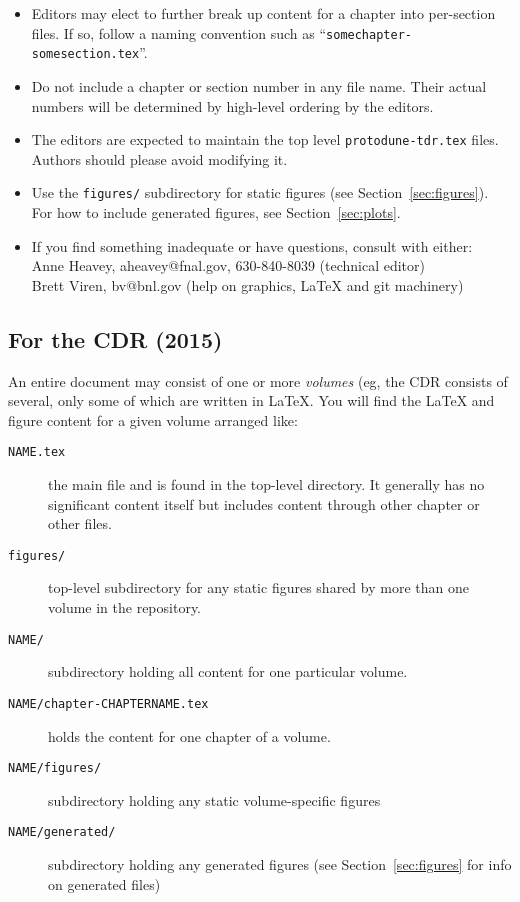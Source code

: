 \begin{itemize}
\item Editors may elect to further break up content for a chapter into per-section
  files.
  If so, follow a naming convention such as
  ``\texttt{somechapter-somesection.tex}''.
\item Do not include a chapter or section number in any file
  name.
  Their actual numbers will be determined by high-level ordering by
  the editors. 
\item The editors are expected to maintain the top level
  \texttt{protodune-tdr.tex} files.  Authors should please avoid modifying it.
\item Use the \texttt{figures/} subdirectory for static figures (see
  Section~\ref{sec:figures}). For how to include generated figures, see
  Section~\ref{sec:plots}.
\item If you find something inadequate or have questions, consult with either: \\
  Anne Heavey, aheavey@fnal.gov, 630-840-8039 (technical editor)\\
  Brett Viren, bv@bnl.gov (help on graphics, \LaTeX{} and git machinery)
\end{itemize}


\subsection{For the CDR (2015)}
\label{ssec:files-cdr}

An entire document may consist of one or more \textit{volumes} (eg,
the CDR consists of several, only some of which are written in
\LaTeX{}.
You will find the \LaTeX{} and figure content for a given volume
arranged like:

\begin{description}
\item[\texttt{NAME.tex}] the main file and is found in the top-level
  directory. It generally has no significant content itself but
  includes content through other chapter or other files.
\item[\texttt{figures/}] top-level subdirectory for any static figures
  shared by more than one volume in the repository.
\item[\texttt{NAME/}] subdirectory holding all content for one particular volume.
\item[\texttt{NAME/chapter-CHAPTERNAME.tex}] holds the content for one
  chapter of a volume.
\item[\texttt{NAME/figures/}] subdirectory holding any static volume-specific figures
\item[\texttt{NAME/generated/}] subdirectory holding any generated
  figures (see Section~\ref{sec:figures} for info on generated files)
\end{description}

